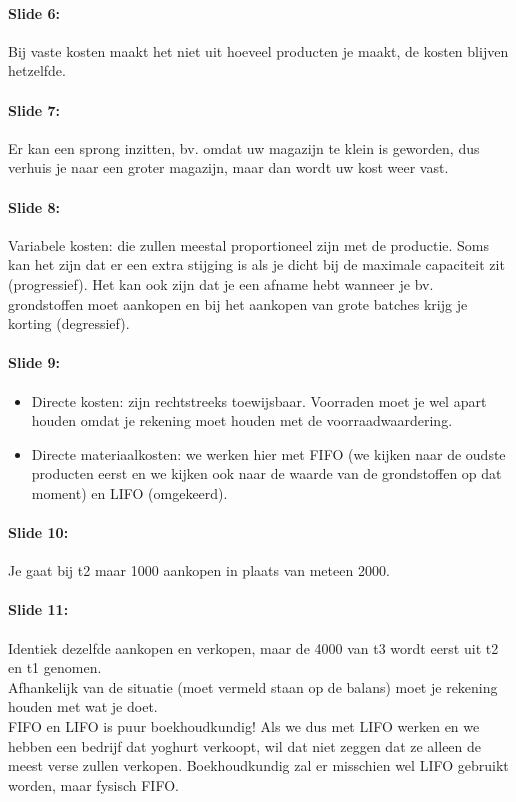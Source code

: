 \documentclass[10pt,a4paper]{report}
\begin{document}
\paragraph{Slide 6:} Bij vaste kosten maakt het niet uit hoeveel producten je maakt, de kosten blijven hetzelfde.

\paragraph{Slide 7:} Er kan een sprong inzitten, bv. omdat uw magazijn te klein is geworden, dus verhuis je naar een groter magazijn, maar dan wordt uw kost weer vast.

\paragraph{Slide 8:} Variabele kosten: die zullen meestal proportioneel zijn met de productie. Soms kan het zijn dat er een extra stijging is als je dicht bij de maximale capaciteit zit (progressief). Het kan ook zijn dat je een afname hebt wanneer je bv. grondstoffen moet aankopen en bij het aankopen van grote batches krijg je korting (degressief). 

\paragraph{Slide 9:}
\begin{itemize}
\item Directe kosten: zijn rechtstreeks toewijsbaar. Voorraden moet je wel apart houden omdat je rekening moet houden met de voorraadwaardering.
\item Directe materiaalkosten: we werken hier met FIFO (we kijken naar de oudste producten eerst en we kijken ook naar de waarde van de grondstoffen op dat moment) en LIFO (omgekeerd).
\end{itemize}

\paragraph{Slide 10:} Je gaat bij t2 maar 1000 aankopen in plaats van meteen 2000.

\paragraph{Slide 11:} Identiek dezelfde aankopen en verkopen, maar de 4000 van t3 wordt eerst uit t2 en t1 genomen.\\
Afhankelijk van de situatie (moet vermeld staan op de balans) moet je rekening houden met wat je doet.\\
FIFO en LIFO is puur boekhoudkundig! Als we dus met LIFO werken en we hebben een bedrijf dat yoghurt verkoopt, wil dat niet zeggen dat ze alleen de meest verse zullen verkopen. Boekhoudkundig zal er misschien wel LIFO gebruikt worden, maar fysisch FIFO.
\end{document}
